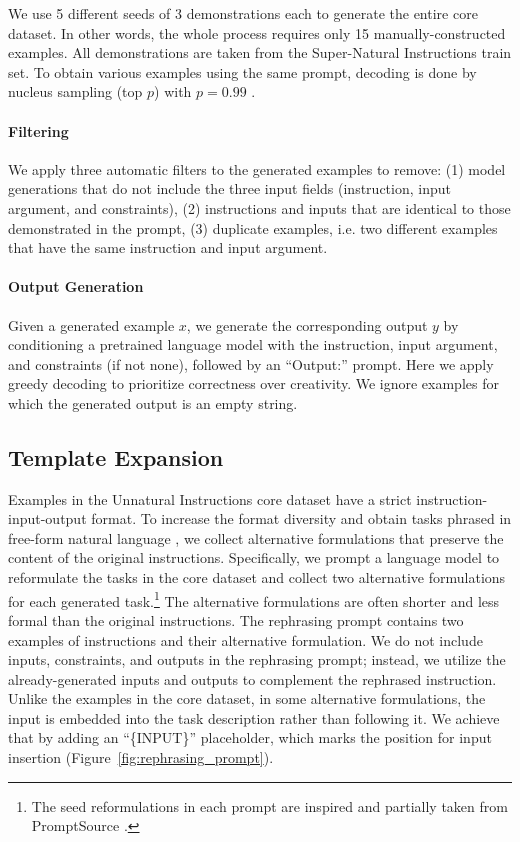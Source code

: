 We use 5 different seeds of 3 demonstrations each to generate the entire core dataset. In other words, the whole process requires only 15 manually-constructed examples. All demonstrations are taken from the Super-Natural Instructions \citep{supernaturalinstructions} train set. To obtain various examples using the same prompt, decoding is done by nucleus sampling (top $p$) with $p=0.99$ \cite{Holtzman2020The}.

\paragraph{Filtering}
We apply three automatic filters to the generated examples to remove: (1) model generations that do not include the three input fields (instruction, input argument, and constraints), (2) instructions and inputs that are identical to those demonstrated in the prompt, (3) duplicate examples, i.e. two different examples that have the same instruction and input argument.

\paragraph{Output Generation} Given a generated example $x$, we generate the corresponding output $y$ by conditioning a pretrained language model with the instruction, input argument, and constraints (if not none), followed by an ``Output:'' prompt. Here we apply greedy decoding to prioritize correctness over creativity. We ignore examples for which the generated output is an empty string.

\subsection{Template Expansion}
\label{sec:template_expansion}
Examples in the Unnatural Instructions core dataset have a strict instruction-input-output format. To increase the format diversity and obtain tasks phrased in free-form natural language \cite{schick-schutze-2021-shot, sanh2021multitask}, we collect alternative formulations that preserve the content of the original instructions. Specifically, we prompt a language model to reformulate the tasks in the core dataset and collect two alternative formulations for each generated task.\footnote{The seed reformulations in each prompt are inspired and partially taken from PromptSource \citep{bach-etal-2022-promptsource}.} The alternative formulations are often shorter and less formal than the original instructions. The rephrasing prompt contains two examples of instructions and their alternative formulation. We do not include inputs, constraints, and outputs in the rephrasing prompt; instead, we utilize the already-generated inputs and outputs to complement the rephrased instruction. Unlike the examples in the core dataset, in some alternative formulations, the input is embedded into the task description rather than following it. We achieve that by adding an ``\{INPUT\}'' placeholder, which marks the position for input insertion (Figure~\ref{fig:rephrasing_prompt}).

